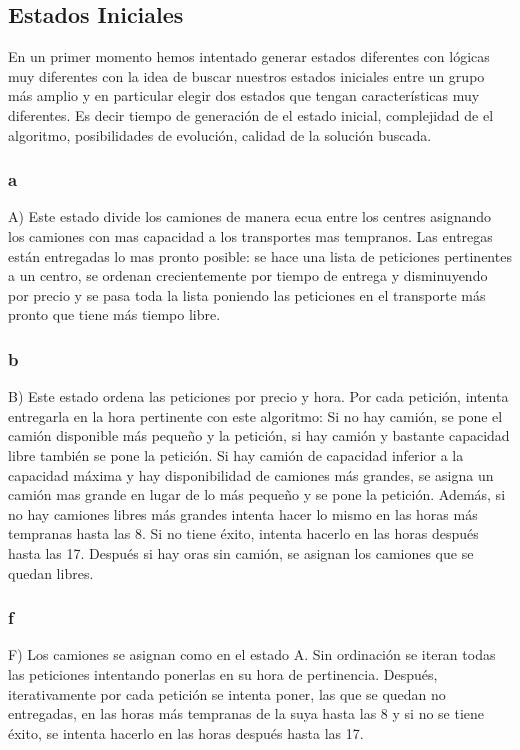 \documentclass{article}
\begin{document}
\subsection{Estados Iniciales}

En un primer momento hemos intentado generar estados diferentes con lógicas muy diferentes con la idea de buscar nuestros estados iniciales entre un grupo más amplio y en particular elegir dos estados que tengan características muy diferentes. Es decir tiempo de generación de el estado inicial, complejidad de el algoritmo, posibilidades de evolución, calidad de la solución buscada.

\subsubsection{a}
A) Este estado divide los camiones de manera ecua entre los centres asignando los camiones con mas capacidad a los transportes mas tempranos. Las entregas están entregadas lo mas pronto posible: se hace una lista de peticiones pertinentes a un centro, se ordenan crecientemente por tiempo de entrega y disminuyendo por precio y se pasa toda la lista poniendo las peticiones en el transporte más pronto que tiene más tiempo libre.

\subsubsection{b}
B) Este estado ordena las peticiones por precio y hora. Por cada petición, intenta entregarla en la hora pertinente con este algoritmo:
Si no hay camión, se pone el camión disponible más pequeño y la petición, si hay camión y bastante capacidad libre también se pone la petición. Si hay camión de capacidad inferior a la capacidad máxima y hay disponibilidad de camiones más grandes, se asigna un camión mas grande en lugar de lo más pequeño y se pone la petición. Además, si no hay camiones libres más grandes intenta hacer lo mismo en las horas más tempranas hasta las 8. Si no tiene éxito, intenta hacerlo en las horas después hasta las 17.
Después si hay oras sin camión, se asignan los camiones que se quedan libres.

\subsubsection{f}
F) Los camiones se asignan como en el estado A. Sin ordinación se iteran todas las peticiones intentando ponerlas en su hora de pertinencia. Después, iterativamente por cada petición se intenta poner, las que se quedan no entregadas, en las horas más tempranas de la suya hasta las 8 y si no se tiene éxito, se intenta hacerlo en las horas después hasta las 17.
\end{document}
